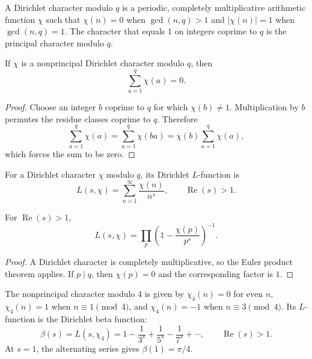 \begin{definition}
A Dirichlet character modulo $q$ is a periodic, completely multiplicative arithmetic function $\chi$ such that $\chi(n)=0$ when $\gcd(n,q)>1$ and $|\chi(n)|=1$ when $\gcd(n,q)=1$. The character that equals $1$ on integers coprime to $q$ is the principal character modulo $q$.
\end{definition}

\begin{proposition}
If $\chi$ is a nonprincipal Dirichlet character modulo $q$, then
\[
 \sum_{a=1}^{q}\chi(a)=0.
\]
\end{proposition}

\begin{proof}
Choose an integer $b$ coprime to $q$ for which $\chi(b)\neq1$. Multiplication by $b$ permutes the residue classes coprime to $q$. Therefore
\[
 \sum_{a=1}^{q}\chi(a)=\sum_{a=1}^{q}\chi(ba)
 =\chi(b)\sum_{a=1}^{q}\chi(a),
\]
which forces the sum to be zero.
\end{proof}

\begin{definition}
For a Dirichlet character $\chi$ modulo $q$, its Dirichlet $L$-function is
\[
 L(s,\chi)=\sum_{n=1}^{\infty}\frac{\chi(n)}{n^s},
 \qquad \operatorname{Re}(s)>1.
\]
\end{definition}

\begin{theorem}
For $\operatorname{Re}(s)>1$,
\[
 L(s,\chi)=\prod_p\left(1-\frac{\chi(p)}{p^s}\right)^{-1}.
\]
\end{theorem}

\begin{proof}
A Dirichlet character is completely multiplicative, so the Euler product theorem applies. If $p\mid q$, then $\chi(p)=0$ and the corresponding factor is $1$.
\end{proof}

\begin{example}
The nonprincipal character modulo $4$ is given by $\chi_4(n)=0$ for even $n$, $\chi_4(n)=1$ when $n\equiv1\pmod4$, and $\chi_4(n)=-1$ when $n\equiv3\pmod4$. Its $L$-function is the Dirichlet beta function:
\[
 \beta(s)=L(s,\chi_4)
 =1-\frac{1}{3^s}+\frac{1}{5^s}-\frac{1}{7^s}+\cdots,
 \qquad \operatorname{Re}(s)>1.
\]
At $s=1$, the alternating series gives $\beta(1)=\pi/4$.
\end{example}

